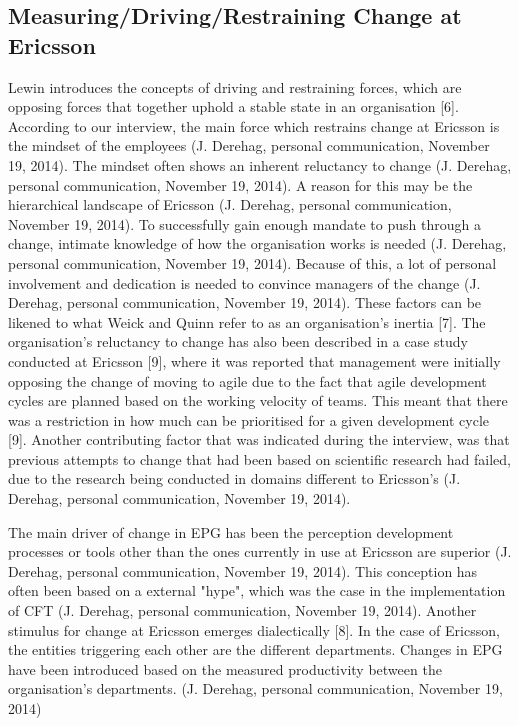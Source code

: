 \documentclass[final_report_innit.tex]{subfiles}
\begin{document}
\subsection*{Measuring/Driving/Restraining Change at Ericsson}
Lewin introduces the concepts of driving and restraining forces, which are opposing forces that together uphold a stable state in an organisation [6]. According to our interview, the main force which restrains change at Ericsson is the mindset of the employees (J. Derehag, personal communication, November 19, 2014). The mindset often shows an inherent reluctancy to change (J. Derehag, personal communication, November 19, 2014). A reason for this may be the hierarchical landscape of Ericsson (J. Derehag, personal communication, November 19, 2014). To successfully gain enough mandate to push through a change, intimate knowledge of how the organisation works is needed (J. Derehag, personal communication, November 19, 2014). Because of this, a lot of personal involvement and dedication is needed to convince managers of the change (J. Derehag, personal communication, November 19, 2014). These factors can be likened to what Weick and Quinn refer to as an organisation's inertia [7]. The organisation's reluctancy to change has also been described in a case study conducted at Ericsson [9], where it was reported that management were initially opposing the change of moving to agile due to the fact that agile development cycles are planned based on the working velocity of teams. This meant that there was a restriction in how much can be prioritised for a given development cycle [9]. Another contributing factor that was indicated during the interview, was that previous attempts to change that had been based on scientific research had failed, due to the research being conducted in domains different to Ericsson's (J. Derehag, personal communication, November 19, 2014). 

The main driver of change in EPG has been the perception development processes or tools other than the ones currently in use at Ericsson are superior (J. Derehag, personal communication, November 19, 2014). This conception has often been based on a external "hype", which was the case in the implementation of CFT (J. Derehag, personal communication, November 19, 2014). Another stimulus for change at Ericsson emerges dialectically [8]. In the case of Ericsson, the entities triggering each other are the different departments. Changes in EPG have been introduced based on the measured productivity between the organisation's departments. (J. Derehag, personal communication, November 19, 2014)
\end{document}
